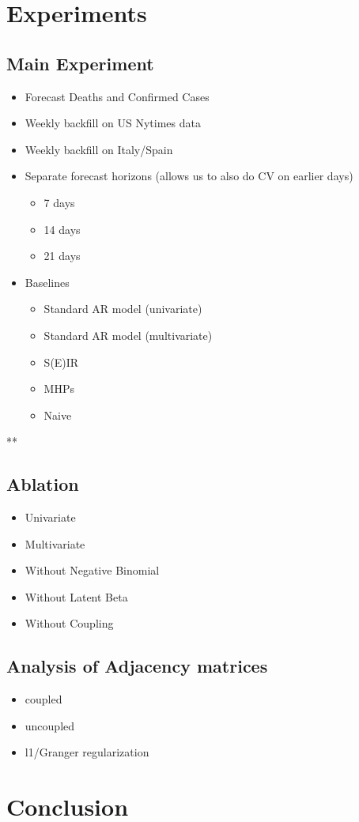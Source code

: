 \documentclass{article}
\begin{document}
\section{Experiments}
\label{sec:orgf0dde8b}
\subsection{Main Experiment}
\label{sec:orgf880694}
\begin{itemize}
\item Forecast Deaths and Confirmed Cases
\item Weekly backfill on US Nytimes data
\item Weekly backfill on Italy/Spain
\item Separate forecast horizons (allows us to also do CV on earlier days)
\begin{itemize}
\item 7 days
\item 14 days
\item 21 days
\end{itemize}
\item Baselines
\begin{itemize}
\item Standard AR model (univariate)
\item Standard AR model (multivariate)
\item S(E)IR
\item MHPs
\item Naive
\end{itemize}
\end{itemize}

**
\subsection{Ablation}
\label{sec:org1ff294f}
\begin{itemize}
\item Univariate
\item Multivariate
\item Without Negative Binomial
\item Without Latent Beta
\item Without Coupling
\end{itemize}

\subsection{Analysis of Adjacency matrices}
\label{sec:orgd29c52d}
\begin{itemize}
\item coupled
\item uncoupled
\item l1/Granger regularization
\end{itemize}

\section{Conclusion}
\label{sec:org40dbb91}

\printbibliography
\end{document}
